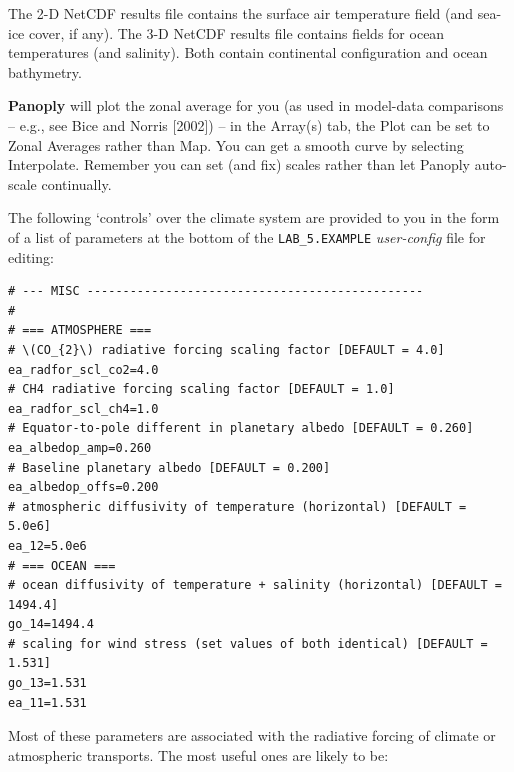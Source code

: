 \documentclass[11pt,fleqn]{book} %
\begin{document}
The 2-D NetCDF results file contains the surface air temperature field (and sea-ice cover, if any). The 3-D NetCDF results file contains fields for ocean temperatures (and salinity). Both contain continental configuration and ocean bathymetry.

\textbf{Panoply} will plot the zonal average for you (as used in model-data comparisons – e.g., see Bice and Norris [2002]) – in the Array(s) tab, the Plot can be set to Zonal Averages rather than Map. You can get a smooth curve by selecting Interpolate. Remember you can set (and fix) scales rather than let Panoply auto-scale continually.

The following ‘controls’ over the climate system are provided to you in the form of a list of parameters at the bottom of the \texttt{LAB\_5.EXAMPLE} \textit{user-config} file for editing:

\small\begin{verbatim}
# --- MISC -----------------------------------------------
#
# === ATMOSPHERE ===
# \(CO_{2}\) radiative forcing scaling factor [DEFAULT = 4.0]
ea_radfor_scl_co2=4.0
# CH4 radiative forcing scaling factor [DEFAULT = 1.0]
ea_radfor_scl_ch4=1.0
# Equator-to-pole different in planetary albedo [DEFAULT = 0.260]
ea_albedop_amp=0.260
# Baseline planetary albedo [DEFAULT = 0.200]
ea_albedop_offs=0.200
# atmospheric diffusivity of temperature (horizontal) [DEFAULT = 5.0e6]
ea_12=5.0e6
# === OCEAN ===
# ocean diffusivity of temperature + salinity (horizontal) [DEFAULT = 1494.4]
go_14=1494.4
# scaling for wind stress (set values of both identical) [DEFAULT = 1.531]
go_13=1.531
ea_11=1.531
\end{verbatim}\normalsize

Most of these parameters are associated with the radiative forcing of climate or atmospheric transports. The most useful ones are likely to be:
\end{document}
